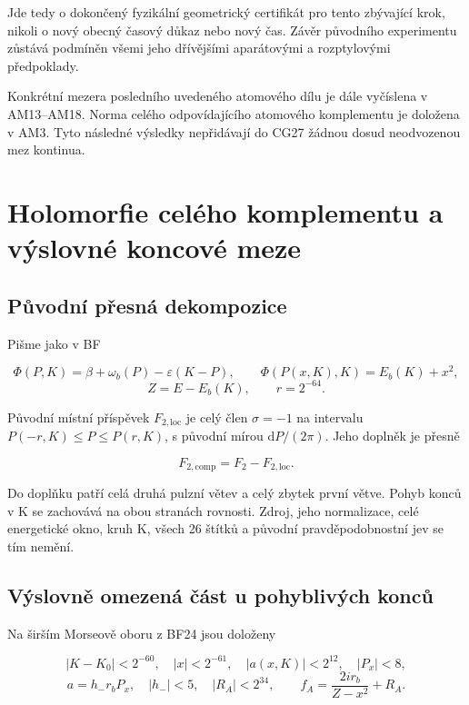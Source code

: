 \documentclass[11pt,a4paper]{article}
\theoremstyle{remark}\newtheorem{remark}[theorem]{Poznámka}
\numberwithin{equation}{section}
\begin{document}
Jde tedy o dokončený fyzikální geometrický certifikát pro tento
zbývající krok, nikoli o nový obecný časový důkaz nebo nový čas. Závěr
původního experimentu zůstává podmíněn všemi jeho dřívějšími aparátovými
a rozptylovými předpoklady.

Konkrétní mezera posledního uvedeného atomového dílu je dále
vyčíslena v AM13--AM18. Norma celého odpovídajícího atomového
komplementu je doložena v AM3. Tyto následné výsledky nepřidávají
do CG27 žádnou dosud neodvozenou mez kontinua.

\clearpage
\section{Holomorfie celého komplementu a výslovné koncové meze}
\hypertarget{pux16fvodnuxed-pux159esnuxe1-dekompozice}{%
\subsection{Původní přesná
dekompozice}\label{pux16fvodnuxed-pux159esnuxe1-dekompozice}}

Pišme jako v BF

\[
\Phi(P,K)=\beta+\omega_b(P)-\varepsilon(K-P),\qquad
\Phi(P(x,K),K)=E_b(K)+x^2,
\] \[
Z=E-E_b(K),\qquad r=2^{-64}.
\tag{HC1}
\]

Původní místní příspěvek \(F_{2,\mathrm{loc}}\) je celý člen
\(\sigma=-1\) na intervalu \(P(-r,K)\le P\le P(r,K)\), s původní mírou
\(\mathrm dP/(2\pi)\). Jeho doplněk je přesně

\[
F_{2,\mathrm{comp}}=F_2-F_{2,\mathrm{loc}}.
\tag{HC2}
\]

Do doplňku patří celá druhá pulzní větev a celý zbytek první větve.
Pohyb konců v K se zachovává na obou stranách rovnosti. Zdroj, jeho
normalizace, celé energetické okno, kruh K, všech 26 štítků a původní
pravděpodobnostní jev se tím nemění.

\hypertarget{vuxfdslovnux11b-omezenuxe1-ux10duxe1st-u-pohyblivuxfdch-koncux16f}{%
\subsection{Výslovně omezená část u pohyblivých
konců}\label{vuxfdslovnux11b-omezenuxe1-ux10duxe1st-u-pohyblivuxfdch-koncux16f}}

Na širším Morseově oboru z BF24 jsou doloženy

\[
|K-K_0|<2^{-60},\quad |x|<2^{-61},\quad
|a(x,K)|<2^{12},\quad |P_x|<8,
\] \[
a=h_-r_bP_x,\quad |h_-|<5,\quad |R_A|<2^{34},\qquad
f_A=\frac{2ir_b}{Z-x^2}+R_A.
\tag{HC3}
\]
\end{document}
